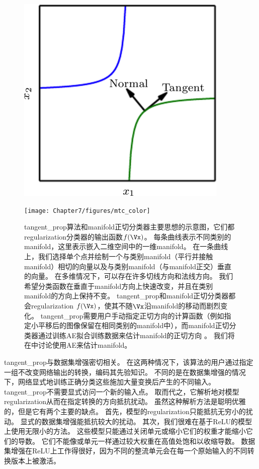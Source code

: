 \begin{figure}[!htb]
\ifOpenSource
\centerline{\includegraphics[scale=0.5]{images/62.png}}
\else
\centerline{\texttt{[image: Chapter7/figures/mtc\_color]}}
\fi
\caption{\gls{tangent_prop}算法\citep{Simard-et-al-1992}和\gls{manifold}正切分类器主要思想的示意图\citep{Rifai-et-al-2011c}，它们都\gls{regularization}分类器的输出函数$f(\Vx)$。
每条曲线表示不同类别的\gls{manifold}，这里表示嵌入二维空间中的一维\gls{manifold}。
在一条曲线上，我们选择单个点并绘制一个与类别\gls{manifold}（平行并接触\gls{manifold}）相切的向量以及与类别\gls{manifold}（与\gls{manifold}正交）垂直的向量。
在多维情况下，可以存在许多切线方向和法线方向。
我们希望分类函数在垂直于\gls{manifold}方向上快速改变，并且在类别\gls{manifold}的方向上保持不变。
\gls{tangent_prop}和\gls{manifold}正切分类器都会\gls{regularization} $f(\Vx)$，使其不随$\Vx$沿\gls{manifold}的移动而剧烈变化。
\gls{tangent_prop}需要用户手动指定正切方向的计算函数（例如指定小平移后的图像保留在相同类别的\gls{manifold}中），而\gls{manifold}正切分类器通过训练\gls{AE}拟合训练数据来估计\gls{manifold}的正切方向 。
我们将在中讨论使用\gls{AE}来估计\gls{manifold}。
}
\label{fig:chap7_mtc_color}
\end{figure}

\gls{tangent_prop}与数据集增强密切相关。
在这两种情况下，该算法的用户通过指定一组不改变网络输出的转换，编码其先验知识。
不同的是在数据集增强的情况下，网络显式地训练正确分类这些施加大量变换后产生的不同输入。
\gls{tangent_prop}不需要显式访问一个新的输入点。
取而代之，它解析地对模型\gls{regularization}从而在指定转换的方向抵抗扰动。
虽然这种解析方法是聪明优雅的，但是它有两个主要的缺点。
首先，模型的\gls{regularization}只能抵抗无穷小的扰动。
显式的数据集增强能抵抗较大的扰动。
其次，我们很难在基于\gls{ReLU}的模型上使用无限小的方法。
这些模型只能通过关闭单元或缩小它们的权重才能缩小它们的导数。
它们不能像或单元一样通过较大权重在高值处饱和以收缩导数。
数据集增强在\gls{ReLU}上工作得很好，因为不同的整流单元会在每一个原始输入的不同转换版本上被激活。

